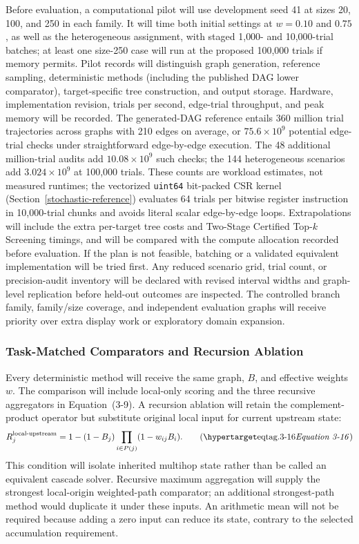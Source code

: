 Before evaluation, a computational pilot will use development seed 41 at
sizes 20, 100, and 250 in each family. It will time both initial settings
at $w=0.10$ and $0.75$, as well as the heterogeneous assignment, with staged
1{,}000- and 10{,}000-trial batches; at least one size-250 case will run at the proposed
100{,}000 trials if memory permits. Pilot records will distinguish graph
generation, reference sampling, deterministic methods (including the
published DAG lower comparator), target-specific tree construction, and
output storage. Hardware, implementation revision,
trials per second, edge-trial throughput, and peak memory will be recorded.
The generated-DAG reference entails 360 million trial trajectories across
graphs with 210 edges on average, or $75.6\times10^9$ potential edge-trial
checks under straightforward edge-by-edge execution. The 48 additional
million-trial audits add
$10.08\times10^9$ such checks; the 144 heterogeneous scenarios add
$3.024\times10^9$ at 100{,}000 trials. These counts are workload estimates,
not measured runtimes; the vectorized \texttt{uint64} bit-packed CSR kernel
(Section~\ref{stochastic-reference}) evaluates 64 trials per bitwise
register instruction in 10{,}000-trial chunks and avoids literal scalar
edge-by-edge loops.
Extrapolations will include the extra per-target tree costs and Two-Stage
Certified Top-$k$ Screening timings, and will be compared
with the compute allocation recorded before evaluation. If the plan is not
feasible, batching or a validated equivalent implementation will be tried
first. Any reduced scenario grid, trial count, or precision-audit inventory
will be declared with revised interval widths and graph-level replication
before held-out outcomes are inspected. The controlled branch family,
family/size coverage, and independent evaluation graphs will receive
priority over extra display work or exploratory domain expansion.

\subsubsection{Task-Matched Comparators and Recursion Ablation}
\label{reference-comparators}

Every deterministic method will receive the same graph, $B$, and effective
weights $w$. The comparison will include local-only scoring and the three
recursive aggregators in Equation~(3-9). A recursion ablation will retain
the complement-product operator but substitute original local input for
current upstream state:
\[
R_j^{\mathrm{local\text{-}upstream}}
=1-(1-B_j)\prod_{i\in P(j)}(1-w_{ij}B_i).
\eqtag{3-16}
\]
This condition will isolate inherited multihop state rather than be called
an equivalent cascade solver. Recursive maximum aggregation will supply
the strongest local-origin weighted-path comparator; an additional
strongest-path method would duplicate it under these inputs. An arithmetic
mean will not be required because adding a zero input can reduce its state,
contrary to the selected accumulation requirement.

